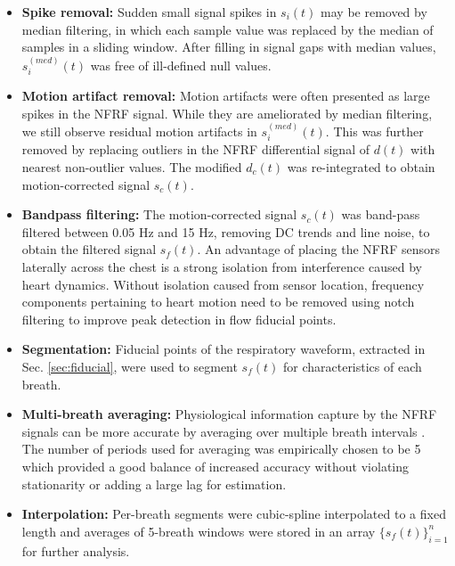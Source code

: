 \documentclass[journal]{IEEEtran}
\begin{document}
\begin{itemize}
    \item \textbf{Spike removal:} Sudden small signal spikes in $s_{i}(t)$ may be removed by median filtering, in which each sample value was replaced by the median of samples in a sliding window. After filling in signal gaps with median values, $s_{i}^{(med)}(t)$ was free of ill-defined null values. 
    \item \textbf{Motion artifact removal:} Motion artifacts were often presented as large spikes in the NFRF signal. While they are ameliorated by median filtering, we still observe residual motion artifacts in $s_{i}^{(med)}(t)$. This was further removed by replacing outliers in the NFRF differential signal of $d(t)$ with nearest non-outlier values. The modified $d_{c}(t)$ was re-integrated to obtain motion-corrected signal $s_{c}(t)$.
    \item \textbf{Bandpass filtering:} The motion-corrected signal $s_{c}(t)$ was band-pass filtered between 0.05 Hz and 15 Hz, removing DC trends and line noise, to obtain the filtered signal $s_f (t)$. An advantage of placing the NFRF sensors laterally across the chest is a strong isolation from interference caused by heart dynamics. Without isolation caused from sensor location, frequency components pertaining to heart motion need to be removed using notch filtering to improve peak detection in flow fiducial points. 
    \item \textbf{Segmentation:} Fiducial points of the respiratory waveform, extracted in Sec. \ref{sec:fiducial}, were used to segment $s_f (t)$ for characteristics of each breath.   
    \item \textbf{Multi-breath averaging:} Physiological information capture by the NFRF signals can be more accurate by averaging over multiple breath intervals \cite{conroyHeartIDBiometric2023}. The number of periods used for averaging was empirically chosen to be 5 which provided a good balance of increased accuracy without violating stationarity or adding a large lag for estimation. 
    \item \textbf{Interpolation:} Per-breath segments were cubic-spline interpolated to a fixed length and averages of 5-breath windows were stored in an array $\{s_f (t)\}_{i=1}^{n}$ for further analysis.
\end{itemize} 
\end{document}
